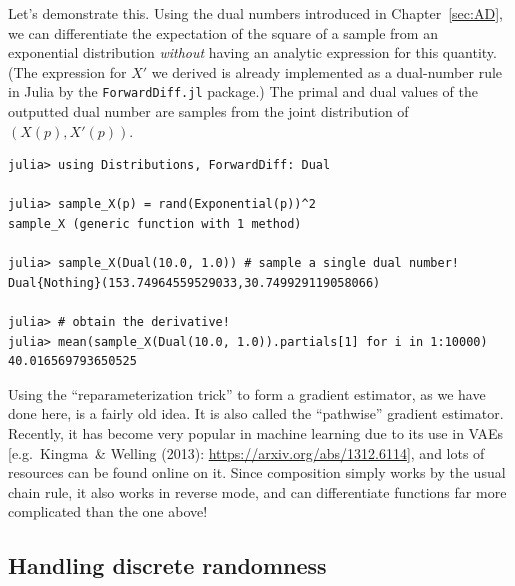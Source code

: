 Let's demonstrate this. Using the dual numbers introduced in Chapter~\ref{sec:AD}, we can differentiate the expectation of the square of a sample 
from an exponential distribution \emph{without} having an analytic expression for this quantity.
(The expression for $X'$ we derived is already implemented as a dual-number rule in Julia by the \texttt{ForwardDiff.jl} package.)
The primal and dual values of the outputted dual number are samples from the joint distribution of $(X(p), X'(p))$.
\begin{verbatim}
julia> using Distributions, ForwardDiff: Dual

julia> sample_X(p) = rand(Exponential(p))^2
sample_X (generic function with 1 method)

julia> sample_X(Dual(10.0, 1.0)) # sample a single dual number!
Dual{Nothing}(153.74964559529033,30.749929119058066)

julia> # obtain the derivative!
julia> mean(sample_X(Dual(10.0, 1.0)).partials[1] for i in 1:10000)
40.016569793650525
\end{verbatim}
Using the ``reparameterization trick'' to form a gradient estimator, as we have done here, is a fairly old idea. It is also called 
the ``pathwise'' gradient estimator. Recently,
it has become very popular in machine learning due to its use in VAEs [e.g.~Kingma~\& Welling (2013): \url{https://arxiv.org/abs/1312.6114}], and lots of resources
can be found online on it. Since composition simply works by the usual chain rule, it also works in reverse mode, and
can differentiate functions far more complicated than the one above!

\subsection{Handling discrete randomness}

